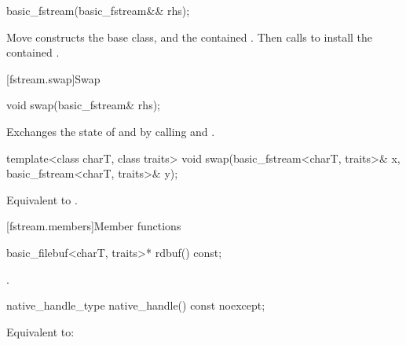 %
\begin{itemdecl}
basic_fstream(basic_fstream&& rhs);
\end{itemdecl}

\begin{itemdescr}
\pnum
\effects
Move constructs the base class, and the contained .
Then calls 
to install the contained .
\end{itemdescr}

[fstream.swap]{Swap}

%
\begin{itemdecl}
void swap(basic_fstream& rhs);
\end{itemdecl}

\begin{itemdescr}
\pnum
\effects
Exchanges the state of 
and  by calling
 and
.
\end{itemdescr}

%
\begin{itemdecl}
template<class charT, class traits>
  void swap(basic_fstream<charT, traits>& x,
            basic_fstream<charT, traits>& y);
\end{itemdecl}

\begin{itemdescr}
\pnum
\effects
Equivalent to .
\end{itemdescr}

[fstream.members]{Member functions}

%
\begin{itemdecl}
basic_filebuf<charT, traits>* rdbuf() const;
\end{itemdecl}

\begin{itemdescr}
\pnum
\returns
{}.
\end{itemdescr}

%
\begin{itemdecl}
native_handle_type native_handle() const noexcept;
\end{itemdecl}

\begin{itemdescr}
\pnum
\effects
Equivalent to: 
\end{itemdescr}

